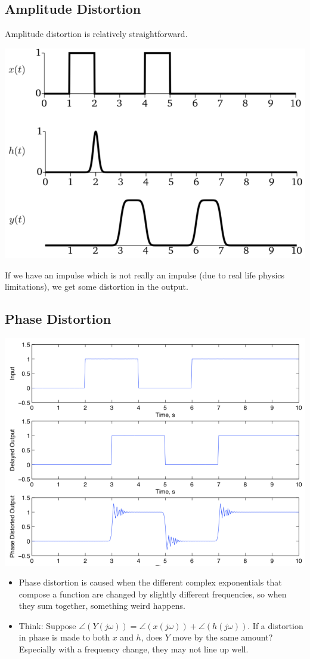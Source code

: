 \documentclass[10pt]{article}
\begin{document}
\subsection*{Amplitude Distortion}
Amplitude distortion is relatively straightforward.
\begin{center}
    \includegraphics[scale=0.5]{W8_3.png}
\end{center}
If we have an impulse which is not really an impulse (due to real life physics limitations), we get some distortion in the output.
\subsection*{Phase Distortion}
\begin{center}
    \includegraphics[scale=0.8]{W8_4.png}
\end{center}
\begin{itemize}
    \item Phase distortion is caused when the different complex exponentials that compose a function are changed by slightly different frequencies, so when they sum together, something weird happens.
    \item Think: Suppose $\angle(Y(j\omega)) = \angle(x(j\omega)) + \angle(h(j\omega))$.  If a distortion in phase is made to both $x$ and $h$, does $Y$ move by the same amount?  Especially with a frequency change, they may not line up well. 
\end{itemize}
\end{document}
